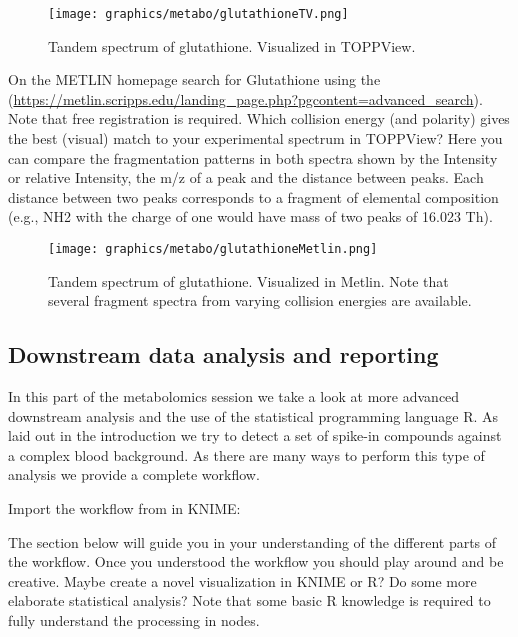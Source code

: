 \begin{figure}[htbp]
  \centering
  \texttt{[image: graphics/metabo/glutathioneTV.png]}
  \caption{Tandem spectrum of glutathione. Visualized in TOPPView.}
  \label{fig:glutathioneTandemSpectrum}
\end{figure}

\begin{task}
On the METLIN homepage search for  Glutathione using the  (\url{https://metlin.scripps.edu/landing_page.php?pgcontent=advanced_search}). Note that free registration is required. Which collision energy (and polarity) gives the best (visual) match to your experimental spectrum in TOPPView? Here you can compare the fragmentation patterns in both spectra shown by the Intensity or relative Intensity, the m/z of a peak and the distance between peaks. Each distance between two peaks corresponds to a fragment of elemental composition (e.g., NH2 with the charge of one would have mass of two peaks of 16.023 Th).
\end{task}

\begin{figure}[htbp]
  \centering
  \texttt{[image: graphics/metabo/glutathioneMetlin.png]}
  \caption{Tandem spectrum of glutathione. Visualized in Metlin. Note that several fragment spectra from varying collision energies are available.}
  \label{fig:glutathioneMetlin}
\end{figure}

\subsection{Downstream data analysis and reporting}
In this part of the metabolomics session we take a look at more advanced downstream analysis and the use of the statistical programming language R. As laid out in the introduction we try to detect a set of spike-in compounds against a complex blood background. As there are many ways to perform this type of analysis we provide a complete workflow.

\begin{task}
Import the workflow from  in KNIME: 
\end{task}

The section below will guide you in your understanding of the different parts of the workflow. Once you understood the workflow you should play around and be creative. Maybe create a novel visualization in KNIME or R? Do some more elaborate statistical analysis? Note that some basic R knowledge is required to fully understand the processing in  nodes.

